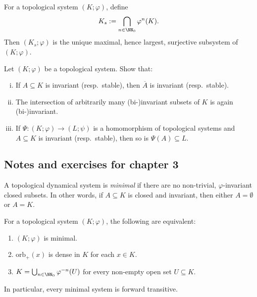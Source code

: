 \begin{corollary}
	For a topological system $(K;\varphi)$, define
	\begin{equation*}
		K_s := \bigcap_{n\in\NN_0} \varphi^n(K).
	\end{equation*}
	Then $(K_s;\varphi)$ is the unique maximal, hence largest, surjective subsystem of $(K;\varphi)$.
\end{corollary}

\begin{exercise}[Ex.\ 2.11]
	Let $(K;\varphi)$ be a topological system. Show that:
	\begin{enumerate}[(i)]
		\item If $A \subseteq K$ is invariant (resp.\ stable), then $\overline{A}$ is invariant (resp.\ stable).
		\item The intersection of arbitrarily many (bi-)invariant subsets of $K$ is again (bi-)invariant.
		\item If $\Psi:(K;\varphi) \to (L;\psi)$ is a homomorphism of topological systems and $A \subseteq K$ is invariant (resp.\ stable), then so is $\Psi(A) \subseteq L$.
	\end{enumerate}
\end{exercise}

\subsection{Notes and exercises for chapter 3}

A topological dynamical system is \emph{minimal} if there are no non-trivial, $\varphi$-invariant closed subsets. In other words, if $A \subseteq K$ is closed and invariant, then either $A=\emptyset$ or $A=K$.

\begin{proposition}[Exercise 3.4]
	For a topological system $(K;\varphi)$, the following are equivalent:
	\begin{enumerate}[\upshape (i)]
		\item $(K;\varphi)$ is minimal.
		\item $\mathrm{orb}_+(x)$ is dense in $K$ for each $x\in K$.
		\item $K = \bigcup_{n\in\NN_0} \varphi^{-n}(U)$ for every non-empty open set $U \subseteq K$.
	\end{enumerate}
	In particular, every minimal system is forward transitive.
\end{proposition}

